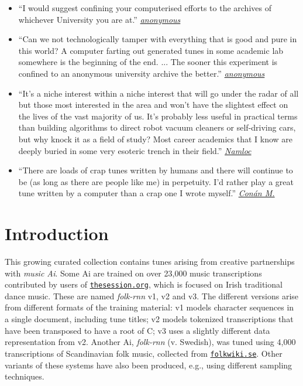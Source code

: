 \documentclass[a4paper,notitlepage,twoside]{book}
\begin{document}
\begin{itemize}
\item ``I would suggest confining your computerised efforts to the archives of whichever University you are at.'' \href{https://thesession.org/discussions/39604}{{\em anonymous}}
\item ``Can we not technologically tamper with everything that is good and pure in this world? A computer farting out generated tunes in some academic lab somewhere is the beginning of the end. ... The sooner this experiment is confined to an anonymous university archive the better.'' \href{https://thesession.org/discussions/40416}{{\em anonymous}}
\item ``It’s a niche interest within a niche interest that will go under the radar of all but those most interested in the area and won’t have the slightest effect on the lives of the vast majority of us. It’s probably less useful in practical terms than building algorithms to direct robot vacuum cleaners or self-driving cars, but why knock it as a field of study? Most career academics that I know are deeply buried in some very esoteric trench in their field.'' \href{https://thesession.org/discussions/39604}{{\em Namloc}}
\item ``There are loads of crap tunes written by humans and there will continue to be (as long as there are people like me) in perpetuity. I’d rather play a great tune written by a computer than a crap one I wrote myself.'' \href{https://thesession.org/discussions/39604}{{\em Conán M.}}
\end{itemize}

\tableofcontents
\mainmatter
\chapter{Introduction}
This growing curated collection contains tunes
arising from creative partnerships with {\em music Ai}. %
Some Ai are trained on over 23,000 music transcriptions 
contributed by users of \href{http://thesession.org}{\tt thesession.org},
which is focused on Irish traditional dance music.
These are named {\em folk-rnn} v1, v2 and v3. 
The different versions arise from
different formats of the training material:
v1 models character sequences in a single document, 
including tune titles;
v2 models tokenized transcriptions that have been transposed to 
have a root of C;
v3 uses a slightly different data representation from v2.
Another Ai, {\em folk-rnn} (v. Swedish), was tuned using 4,000 transcriptions of 
Scandinavian folk music, collected from \href{http://folkwiki.se}{\tt folkwiki.se}.
Other variants of these systems have also been produced,
e.g., using different sampling techniques.
\end{document}
